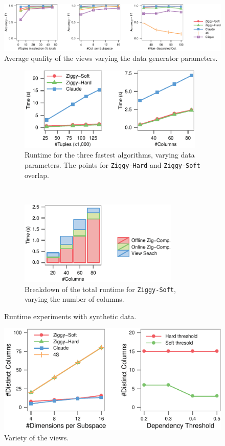 \begin{figure}[t!]
  \centering
  \includegraphics[width=\textwidth]{Plots/Synth-Accuracy}
  \caption{Average quality of the views varying the data generator parameters.}
  \label{pic:synthquali}
\end{figure}
\begin{figure}[t!]
    \centering
    \begin{subfigure}[b]{0.5\textwidth}
    \includegraphics[height=4cm, width=\textwidth]{Plots/Synth-Runtime}
    \caption{Runtime for the three fastest algorithms, varying data parameters.
    The points for \texttt{Ziggy-Hard} and \texttt{Ziggy-Soft} overlap.}
    \label{pic:genruntime}
    \end{subfigure}
    ~~
    \begin{subfigure}[b]{0.45\textwidth}
        \includegraphics[height=4cm, width=\textwidth]{Plots/Synth-TimeDetail}
        \caption{Breakdown of the total runtime for \texttt{Ziggy-Soft},
        varying the number of columns.}
    \label{pic:detruntime}
    \end{subfigure}
  \label{pic:syntruntime}
    \caption{Runtime experiments with synthetic data.}
\end{figure}
\begin{figure}[t!]
  \centering
  \includegraphics[width=\columnwidth]{Plots/Synth-Dedup}
  \caption{Variety of the views.}
  \label{pic:synthvariety}
\end{figure}
